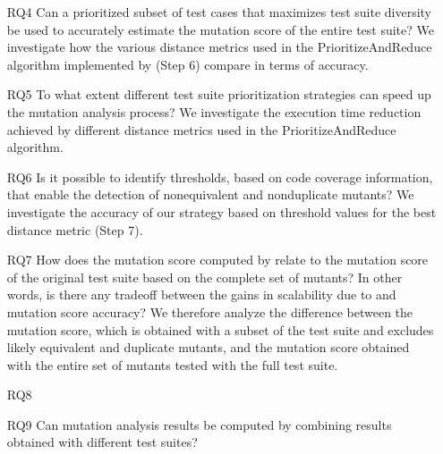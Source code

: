 \begin{itemize}
    \item[RQ4]  Can a prioritized subset of test cases that maximizes test suite diversity be used to accurately estimate the mutation score of the entire test suite?
    We investigate how the various distance metrics used in the PrioritizeAndReduce algorithm implemented by \APPR  (Step 6) compare in terms of accuracy.


    \item[RQ5]  To what extent different test suite prioritization strategies can speed up the mutation analysis process? We investigate the execution time reduction achieved by different distance metrics used in the PrioritizeAndReduce algorithm.


    \item[RQ6]  Is it possible to identify thresholds, based on code coverage information, that enable the detection of nonequivalent and nonduplicate mutants? We investigate
    the accuracy of our strategy
    based on threshold values for the best distance metric  (\APPR  Step 7).


    \item[RQ7]  How does the mutation score computed by \APPR relate to the mutation score of the original test suite based on the complete set of mutants? In other words, is there any tradeoff between the gains in scalability due to \APPR and  mutation score accuracy? We therefore analyze the difference between the \APPR mutation score, which is obtained with a subset of the test suite and excludes likely equivalent and duplicate mutants, and the mutation score obtained with the entire set of mutants tested with the full test suite.

    \item[RQ8] 

    \item[RQ9] Can mutation analysis results be computed by combining results obtained with different test suites?



\end{itemize}

